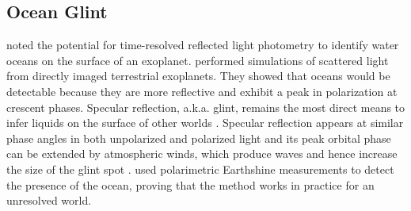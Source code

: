 \documentclass[
    usenatbib,
]{mnras}
\begin{document}
\subsection{Ocean Glint}
\cite{2001Natur.412..885F} noted the potential for time-resolved reflected light photometry to identify water oceans on the surface of an exoplanet.  \cite{2008Icar..195..927W} performed simulations of scattered light from directly imaged terrestrial exoplanets. 
They showed that oceans would be detectable because they are more reflective and exhibit a peak in polarization at crescent phases. %
Specular reflection, a.k.a. glint, remains the most direct means to infer liquids on the surface of other worlds \citep[e.g., Titan's methane lakes;][]{2010GeoRL..37.7104S}. %
Specular reflection appears at similar phase angles in both unpolarized and polarized light and its peak orbital phase can be extended by atmospheric winds, which produce waves and hence increase the size of the glint spot \citep{2011Icar..211..722B,kopparla2018}.
\citet{Takahashi2021} used polarimetric Earthshine measurements to detect the presence of the ocean, proving that the method works in practice for an unresolved world.




\end{document}
